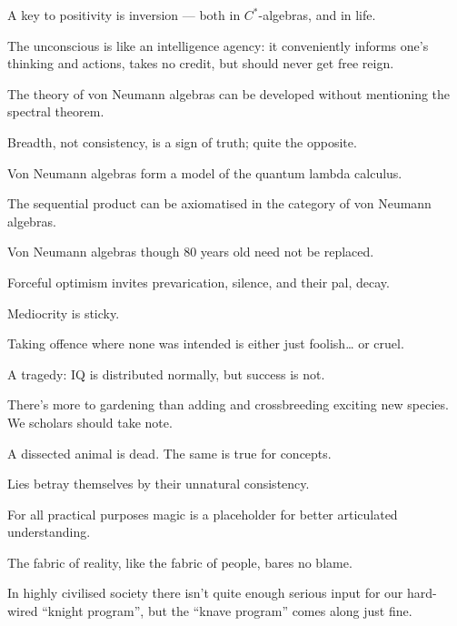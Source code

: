 \documentclass[a]{subfiles}
\begin{document}
\begin{parsec}%
A key to positivity is inversion --- both in  $C^*$-algebras,
and in life.
\end{parsec}
\begin{parsec}
The unconscious is like an intelligence agency:
it conveniently informs one's thinking and actions,
takes no credit,
but should never get free reign.
\end{parsec}
\begin{parsec}%
The theory of von Neumann algebras
can be developed without mentioning
the spectral theorem.
\end{parsec}
\begin{parsec}%
Breadth, not consistency, is a sign of truth;
quite the opposite.
\end{parsec}
\begin{parsec}
Von Neumann algebras form a model of the quantum lambda calculus.
\end{parsec}
\begin{parsec}
The sequential product can be axiomatised in the category of von Neumann
algebras.
\end{parsec}
\begin{parsec}%
Von Neumann algebras
though 80 years old
need not be replaced.
\end{parsec}
\begin{parsec}%
Forceful optimism
invites prevarication, silence,
and their pal, decay.
\end{parsec}
\begin{parsec}%
Mediocrity is sticky.
\end{parsec}
\begin{parsec}%
Taking offence where none was intended
is either just foolish\dots{} or cruel.
\end{parsec}
\begin{parsec}%
A tragedy:
IQ is distributed normally,
but success is not.
\end{parsec}
\begin{parsec}%
There's more to gardening
than adding and crossbreeding exciting new species.
We scholars should take note.
\end{parsec}
\begin{parsec}%
A dissected animal is dead.
The same is true for concepts.
\end{parsec}
\begin{parsec}%
Lies betray themselves by their
unnatural consistency.
\end{parsec}
\begin{parsec}%
For all practical purposes
magic is a placeholder for better
articulated understanding.
\end{parsec}
\begin{parsec}%
The fabric
of reality,
like the fabric of people,
bares no blame.
\end{parsec}
\begin{parsec}%
In highly civilised society
there isn't quite enough serious input
for our hard-wired ``knight program'',
but the ``knave program'' comes along just fine.
\end{parsec}
\end{document}
